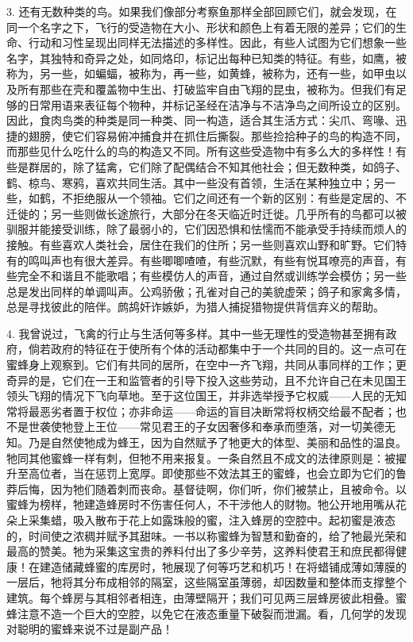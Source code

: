 3. 还有无数种类的鸟。如果我们像部分考察鱼那样全部回顾它们，就会发现，在同一个名字之下，飞行的受造物在大小、形状和颜色上有着无限的差异；它们的生命、行动和习性呈现出同样无法描述的多样性。因此，有些人试图为它们想象一些名字，其独特和奇异之处，如同烙印，标记出每种已知类的特征。有些，如鹰，被称为，另一些，如蝙蝠，被称为，再一些，如黄蜂，被称为，还有一些，如甲虫以及所有那些在壳和覆盖物中生出、打破监牢自由飞翔的昆虫，被称为。但我们有足够的日常用语来表征每个物种，并标记圣经在洁净与不洁净鸟之间所设立的区别。因此，食肉鸟类的种类是同一种类、同一构造，适合其生活方式：尖爪、弯喙、迅捷的翅膀，使它们容易俯冲捕食并在抓住后撕裂。那些捡拾种子的鸟的构造不同，而那些见什么吃什么的鸟的构造又不同。所有这些受造物中有多么大的多样性！有些是群居的，除了猛禽，它们除了配偶结合不知其他社会；但无数种类，如鸽子、鹤、椋鸟、寒鸦，喜欢共同生活。其中一些没有首领，生活在某种独立中；另一些，如鹤，不拒绝服从一个领袖。它们之间还有一个新的区别：有些是定居的、不迁徙的；另一些则做长途旅行，大部分在冬天临近时迁徙。几乎所有的鸟都可以被驯服并能接受训练，除了最弱小的，它们因恐惧和怯懦而不能承受手持续而烦人的接触。有些喜欢人类社会，居住在我们的住所；另一些则喜欢山野和旷野。它们特有的鸣叫声也有很大差异。有些唧唧喳喳，有些沉默，有些有悦耳嘹亮的声音，有些完全不和谐且不能歌唱；有些模仿人的声音，通过自然或训练学会模仿；另一些总是发出同样的单调叫声。公鸡骄傲；孔雀对自己的美貌虚荣；鸽子和家禽多情，总是寻找彼此的陪伴。鹧鸪奸诈嫉妒，为猎人捕捉猎物提供背信弃义的帮助。\par

4. 我曾说过，飞禽的行止与生活何等多样。其中一些无理性的受造物甚至拥有政府，倘若政府的特征在于使所有个体的活动都集中于一个共同的目的。这一点可在蜜蜂身上观察到。它们有共同的居所，在空中一齐飞翔，共同从事同样的工作；更奇异的是，它们在一王和监管者的引导下投入这些劳动，且不允许自己在未见国王领头飞翔的情况下飞向草地。至于这位国王，并非选举授予它权威——人民的无知常将最恶劣者置于权位；亦非命运——命运的盲目决断常将权柄交给最不配者；也不是世袭使牠登上王位——常见君王的子女因奢侈和奉承而堕落，对一切美德无知。乃是自然使牠成为蜂王，因为自然赋予了牠更大的体型、美丽和品性的温良。牠同其他蜜蜂一样有刺，但牠不用来报复。一条自然且不成文的法律原则是：被擢升至高位者，当在惩罚上宽厚。即使那些不效法其王的蜜蜂，也会立即为它们的鲁莽后悔，因为牠们随着刺而丧命。基督徒啊，你们听，你们被禁止，且被命令。以蜜蜂为榜样，牠建造蜂房时不伤害任何人，不干涉他人的财物。牠公开地用嘴从花朵上采集蜡，吸入散布于花上如露珠般的蜜，注入蜂房的空腔中。起初蜜是液态的，时间使之浓稠并赋予其甜味。一书以称蜜蜂为智慧和勤奋的，给了牠最光荣和最高的赞美。牠为采集这宝贵的养料付出了多少辛劳，这养料使君王和庶民都得健康！在建造储藏蜂蜜的库房时，牠展现了何等巧艺和机巧！在将蜡铺成薄如薄膜的一层后，牠将其分布成相邻的隔室，这些隔室虽薄弱，却因数量和整体而支撑整个建筑。每个蜂房与其相邻者相连，由薄壁隔开；我们可见两三层蜂房彼此相叠。蜜蜂注意不造一个巨大的空腔，以免它在液态重量下破裂而泄漏。看，几何学的发现对聪明的蜜蜂来说不过是副产品！\par

